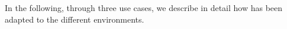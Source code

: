 In the following, through three use cases, we describe in detail how \scipion has been adapted to the different environments.









